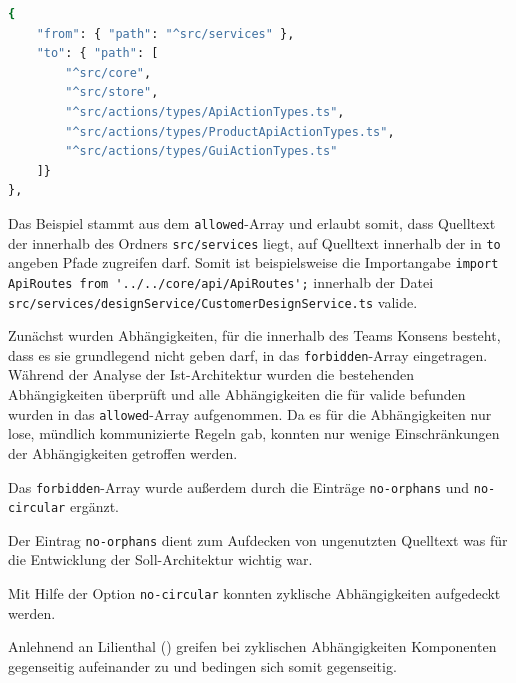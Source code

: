\begin{lstlisting}[language={sh}, label=depcruise-example, caption=Beispiel einer Abhängigkeitesrelation]
{
    "from": { "path": "^src/services" },
    "to": { "path": [
        "^src/core",
        "^src/store",
        "^src/actions/types/ApiActionTypes.ts",
        "^src/actions/types/ProductApiActionTypes.ts",
        "^src/actions/types/GuiActionTypes.ts"
    ]}
},
\end{lstlisting}
Das Beispiel stammt aus dem \lstinline|allowed|-Array und erlaubt somit, dass Quelltext der innerhalb des Ordners \lstinline|src/services| liegt, auf Quelltext innerhalb der in \lstinline|to| angeben Pfade zugreifen darf. 
Somit ist beispielsweise die Importangabe \newline  
\glqq\lstinline|import ApiRoutes from '../../core/api/ApiRoutes';|\grqq \newline
innerhalb der Datei \lstinline|src/services/designService/CustomerDesignService.ts| valide.

Zunächst wurden Abhängigkeiten, für die innerhalb des Teams Konsens besteht, dass es sie grundlegend nicht geben darf, in das \lstinline|forbidden|-Array eingetragen. Während der Analyse der Ist-Architektur wurden die bestehenden Abhängigkeiten überprüft und alle Abhängigkeiten die für valide befunden wurden in das \lstinline|allowed|-Array aufgenommen. Da es für die Abhängigkeiten nur lose, mündlich kommunizierte Regeln gab, konnten nur wenige Einschränkungen der Abhängigkeiten getroffen werden.  

Das \lstinline|forbidden|-Array wurde außerdem durch die Einträge 
\lstinline|no-orphans| und \lstinline|no-circular| ergänzt.

Der Eintrag \lstinline|no-orphans| dient zum Aufdecken von ungenutzten Quelltext was für die Entwicklung der Soll-Architektur wichtig war.

Mit Hilfe der Option \lstinline|no-circular| konnten zyklische Abhängigkeiten aufgedeckt werden.

Anlehnend an Lilienthal (\citeyear[vgl.][88 - 90]{Lilienthal2019}) greifen bei zyklischen Abhängigkeiten Komponenten gegenseitig aufeinander zu und bedingen sich somit gegenseitig. 

